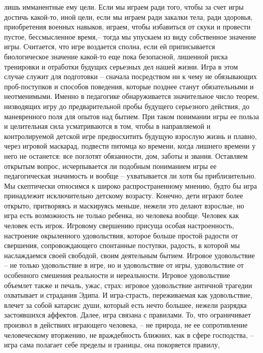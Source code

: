 \documentclass[12pt]{article}
\begin{document}
лишь имманентные ему цели. Если мы играем ради того, чтобы за счет игры достичь какой-то, иной цели, если
мы играем ради закалки тела, ради здоровья, приобретения военных навыков, играем, чтобы избавиться от
скуки и провести пустое, бессмысленное время,-- тогда мы упускаем из виду собственное значение игры.
Считается,  что  игре  воздается  сполна,  если  ей  приписывается  биологическое  значение  какой-то  еще  пока
безопасной, лишенной риска тренировки и отработки будущих серьезных дел нашей жизни. Игра в этом случае
служит  для  подготовки  --  сначала  посредством  ни  к  чему  не  обязывающих  проб-поступков  и  способов
поведения, которые позднее станут обязательными и неотменимыми. Именно в педагогике обнаруживается
значительное число теорем, низводящих игру до предварительной пробы будущего серьезного действия, до
маневренного  поля  для  опытов  над  бытием.  При  таком  понимании  игры  ее  польза  и  целительная  сила
усматриваются в том, чтобы в направляемой и контролируемой детской игре предвосхитить будущую взрослую
жизнь и плавно, через игровой маскарад, подвести питомца ко времени, когда лишнего времени у него не
останется: все поглотят обязанности, дом, заботы и звания. Оставляем открытым вопрос, исчерпывается ли
подобным  пониманием  игры  ее  педагогическая  значимость  и  вообще  --  ухватывается  ли  хотя  бы
приблизительно. Мы скептически относимся к широко распространенному мнению, будто бы игра принадлежит
исключительно детскому возрасту. Конечно, дети играют более открыто, притворяясь и маскируясь меньше,
нежели это делают взрослые, но игра есть возможность не только ребенка, но человека вообще. Человек как
человек  есть  игрок.  Игровому  свершению  присуща  особая  настроенность,  настроение  окрыленного
удовольствия,  которое  больше  простой  радости  от  свершения,  сопровождающего  спонтанные  поступки,
радость, в которой мы наслаждаемся своей свободой, своим деятельным бытием. Игровое удовольствие -- не
только удовольствие в игре, но и удовольствие от игры, удовольствие от особенного смешения реальности и
нереальности. Игровое удовольствие объемлет также и печаль, ужас, страх: игровое удовольствие античной
трагедии  охватывает  и  страдания  Эдипа.  И  игра-страсть,  переживаемая  как  удовольствие,  влечет  за  собой
катарсис души, который есть нечто большее,
 нежели разрядка застоявшихся аффектов. Далее, игра связана с правилами. То, что ограничивает произвол в
действиях играющего человека, -- не природа, не ее сопротивление человеческому вторжению, не враждебность
ближних, как в сфере господства, -- игра сама полагает себе пределы и границы, она покоряется правилу,
\end{document}
